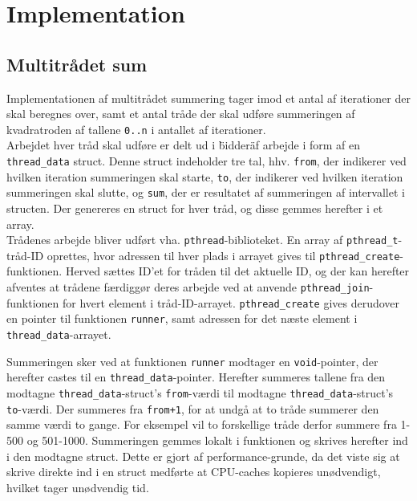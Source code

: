 \section{Implementation}

\subsection{Multitrådet sum}
Implementationen af multitrådet summering tager imod et antal af iterationer der skal beregnes over, samt et antal tråde der skal udføre summeringen af kvadratroden af tallene \texttt{0..n} i antallet af iterationer. \\

Arbejdet hver tråd skal udføre er delt ud i \"bidder\" af arbejde i form af en \texttt{thread_data} struct. Denne struct indeholder tre tal, hhv. \texttt{from}, der indikerer ved hvilken iteration summeringen skal starte, \texttt{to}, der indikerer ved hvilken iteration summeringen skal slutte, og \texttt{sum}, der er resultatet af summeringen af intervallet i structen. Der genereres en struct for hver tråd, og disse gemmes herefter i et array.\\

Trådenes arbejde bliver udført vha. \texttt{pthread}-biblioteket. En array af \texttt{pthread_t}-tråd-ID oprettes, hvor adressen til hver plads i arrayet gives til \texttt{pthread_create}-funktionen. Herved sættes ID'et for tråden til det aktuelle ID, og der kan herefter afventes at trådene færdiggør deres arbejde ved at anvende \texttt{pthread_join}-funktionen for hvert element i tråd-ID-arrayet.
\texttt{pthread_create} gives derudover en pointer til funktionen \texttt{runner}, samt adressen for det næste element i \texttt{thread_data}-arrayet. 

Summeringen sker ved at funktionen \texttt{runner} modtager en \texttt{void}-pointer, der herefter castes til en \texttt{thread_data}-pointer.
Herefter summeres tallene fra den modtagne \texttt{thread_data}-struct's \texttt{from}-værdi til modtagne \texttt{thread_data}-struct's \texttt{to}-værdi. Der summeres fra \texttt{from+1}, for at undgå at to tråde summerer den samme værdi to gange. For eksempel vil to forskellige tråde derfor summere fra 1-500 og 501-1000.
Summeringen gemmes lokalt i funktionen og skrives herefter ind i den modtagne struct. Dette er gjort af performance-grunde, da det viste sig at skrive direkte ind i en struct medførte at CPU-caches kopieres unødvendigt, hvilket tager unødvendig tid. \\

